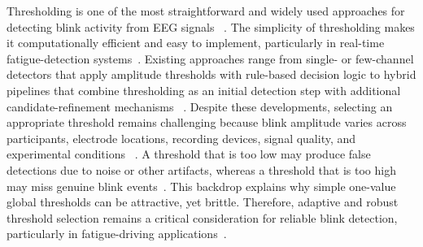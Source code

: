 Thresholding is one of the most straightforward and widely used approaches for detecting blink activity from EEG signals ~\citep{tran2021detection,chang2016detection}.
The simplicity of thresholding makes it computationally efficient and easy to implement, particularly in real-time fatigue-detection systems~\citep{tran2021detection,jefri2022eye}.
Existing approaches range from single- or few-channel detectors that apply amplitude thresholds with rule-based decision logic to hybrid pipelines that combine thresholding as an initial detection step with additional candidate-refinement mechanisms ~\citep{nolan2010faster, chang2016detection,jiang2023eyeblink, ghosh2023automatic,tran2021detection,zhang2023method,wang2022multidimensional,wang2025sliding,kleifges2017blinker,cao2021unsupervised,agarwal2019blink,valderrama2018automatic,guttmann2019new}.
Despite these developments, selecting an appropriate threshold remains challenging because blink amplitude varies across participants, electrode locations, recording devices, signal quality, and experimental conditions ~\citep{guttmann2019new,wang2022multidimensional}.
A threshold that is too low may produce false detections due to noise or other artifacts, whereas a threshold that is too high may miss genuine blink events~\citep{tran2021detection,jefri2022eye}.
This backdrop explains why simple one-value global thresholds can be attractive, yet brittle.
Therefore, adaptive and robust threshold selection remains a critical consideration for reliable blink detection, particularly in fatigue-driving applications~\citep{ko2020eyeblink,shahbakhti2023fusion}.

